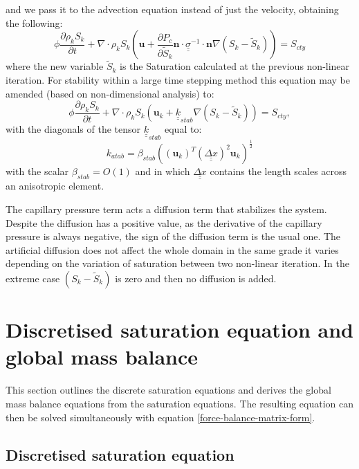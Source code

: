  and we pass it to the advection equation instead of just the velocity, obtaining the following:%
\begin{equation}
\phi \frac{\partial  \rho_k S_k}{\partial t} + \nabla \cdot \rho_k S_k (\mathbf{u} +  \frac{\partial  P_c}{\partial \tilde{S}_k}  \mathbf{n}\cdot \underline {\underline\sigma}^{-1} \cdot \mathbf{n} \nabla (S_k - \tilde{S}_k) ) = S_{cty}
\end{equation}
where the new variable $  \tilde{S}_k$ is the Saturation calculated at the previous non-linear iteration.
For stability within a large time stepping method this equation may be amended (based on non-dimensional analysis) to:
\begin{equation}
\phi \frac{\partial  \rho_k S_k}{\partial t} + \nabla \cdot \rho_k S_k (\mathbf{u}_k +  {\underline{\underline k}}_{stab}  \nabla (S_k - \tilde{S}_k) ) = S_{cty},
\end{equation}
with the diagonals of the tensor ${\underline{\underline k}}_{stab}$ equal to:
\begin{equation}
 k_{atab}  =  \beta_{stab} ( (\mathbf{u}_k)^T (\underline{\underline {\Delta x}})^2\mathbf{u}_k )^{\frac{1}{2}}
\end{equation}
with the scalar $\beta_{stab}=O(1)$ and in which $\underline{\underline {\Delta x}}$ contains the
length scales across an anisotropic element.

The capillary pressure term acts a diffusion term that stabilizes the system. Despite the diffusion has a positive value, as the derivative of the capillary pressure is always negative, the sign of the diffusion term is the usual one. The artificial diffusion does not affect the whole domain in the same grade it varies depending on the variation of saturation between two non-linear iteration. In the extreme case $ (S_k - \tilde{S}_k) $ is zero and then no diffusion is added.

\section{Discretised saturation equation and global mass balance}

This section outlines the discrete saturation equations and derives the global mass balance equations from the saturation equations. The resulting equation can then be solved simultaneously with equation \ref{force-balance-matrix-form}.


\subsection{Discretised saturation equation}

